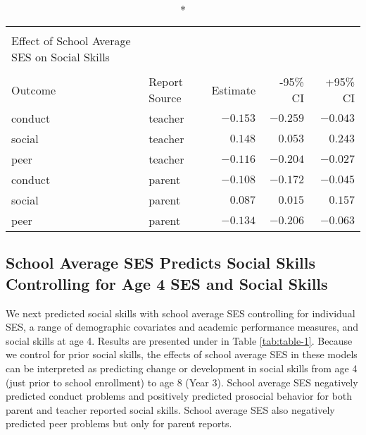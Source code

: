 \documentclass[
  english,
  man]{apa6}
\begin{document}
\captionsetup[table]{labelformat=empty,skip=1pt}
\begin{longtable}{llrrr}
\caption*{
\large Table 1\\ 
\small Effect of School Average SES on Social Skills\\ 
} \\ 
\toprule
Outcome & Report Source & Estimate & -95\% CI & +95\% CI \\ 
\midrule
conduct & teacher & $-0.153$ & $-0.259$ & $-0.043$ \\ 
social & teacher & $0.148$ & $0.053$ & $0.243$ \\ 
peer & teacher & $-0.116$ & $-0.204$ & $-0.027$ \\ 
conduct & parent & $-0.108$ & $-0.172$ & $-0.045$ \\ 
social & parent & $0.087$ & $0.015$ & $0.157$ \\ 
peer & parent & $-0.134$ & $-0.206$ & $-0.063$ \\ 
\bottomrule
\end{longtable}

\hypertarget{school-average-ses-predicts-social-skills-controlling-for-age-4-ses-and-social-skills}{%
\subsection{School Average SES Predicts Social Skills Controlling for Age 4 SES and Social Skills}\label{school-average-ses-predicts-social-skills-controlling-for-age-4-ses-and-social-skills}}

We next predicted social skills with school average SES controlling for individual SES, a range of demographic covariates and academic performance measures, and social skills at age 4. Results are presented under in Table \ref{tab:table-1}. Because we control for prior social skills, the effects of school average SES in these models can be interpreted as predicting change or development in social skills from age 4 (just prior to school enrollment) to age 8 (Year 3). School average SES negatively predicted conduct problems and positively predicted prosocial behavior for both parent and teacher reported social skills. School average SES also negatively predicted peer problems but only for parent reports.
\end{document}
